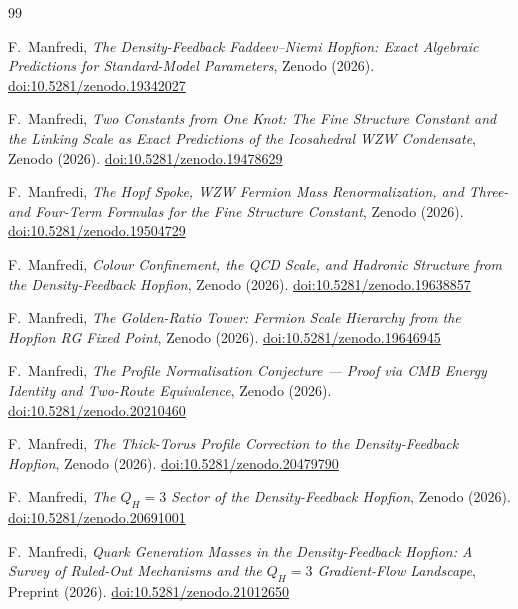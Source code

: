 \documentclass[11pt,a4paper]{article}
\theoremstyle{definition}\newtheorem{definition}[theorem]{Definition}
\theoremstyle{remark}
\begin{document}
\begin{thebibliography}{99}

F.~Manfredi,
\textit{The Density-Feedback Faddeev--Niemi Hopfion:
  Exact Algebraic Predictions for Standard-Model Parameters},
Zenodo (2026).
\href{https://doi.org/10.5281/zenodo.19342027}{doi:10.5281/zenodo.19342027}

F.~Manfredi,
\textit{Two Constants from One Knot: The Fine Structure Constant and
  the Linking Scale as Exact Predictions of the Icosahedral WZW Condensate},
Zenodo (2026).
\href{https://doi.org/10.5281/zenodo.19478629}{doi:10.5281/zenodo.19478629}

F.~Manfredi,
\textit{The Hopf Spoke, WZW Fermion Mass Renormalization,
  and Three- and Four-Term Formulas for the Fine Structure Constant},
Zenodo (2026).
\href{https://doi.org/10.5281/zenodo.19504729}{doi:10.5281/zenodo.19504729}

F.~Manfredi,
\textit{Colour Confinement, the QCD Scale, and Hadronic Structure
  from the Density-Feedback Hopfion},
Zenodo (2026).
\href{https://doi.org/10.5281/zenodo.19638857}{doi:10.5281/zenodo.19638857}

F.~Manfredi,
\textit{The Golden-Ratio Tower: Fermion Scale Hierarchy from the Hopfion RG Fixed Point},
Zenodo (2026).
\href{https://doi.org/10.5281/zenodo.19646945}{doi:10.5281/zenodo.19646945}

F.~Manfredi,
\textit{The Profile Normalisation Conjecture ---
  Proof via CMB Energy Identity and Two-Route Equivalence},
Zenodo (2026).
\href{https://doi.org/10.5281/zenodo.20210460}{doi:10.5281/zenodo.20210460}

F.~Manfredi,
\textit{The Thick-Torus Profile Correction to the Density-Feedback Hopfion},
Zenodo (2026).
\href{https://doi.org/10.5281/zenodo.20479790}{doi:10.5281/zenodo.20479790}

F.~Manfredi,
\textit{The $Q_H=3$ Sector of the Density-Feedback Hopfion},
Zenodo (2026).
\href{https://doi.org/10.5281/zenodo.20691001}{doi:10.5281/zenodo.20691001}

F.~Manfredi,
\textit{Quark Generation Masses in the Density-Feedback Hopfion:
A Survey of Ruled-Out Mechanisms and the $Q_H=3$ Gradient-Flow Landscape},
Preprint (2026).
\href{https://doi.org/10.5281/zenodo.21012650}{doi:10.5281/zenodo.21012650}


\end{thebibliography}
\end{document}
